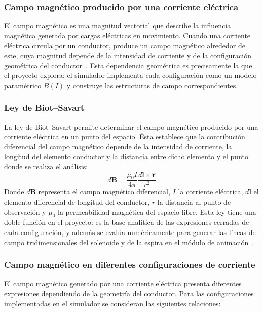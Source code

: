 \documentclass{article}
\begin{document}
\subsubsection{Campo magnético producido por una corriente eléctrica}

El campo magnético es una magnitud vectorial que describe la influencia magnética generada por cargas eléctricas en movimiento. Cuando una corriente eléctrica circula por un conductor, produce un campo magnético alrededor de este, cuya magnitud depende de la intensidad de corriente y de la configuración geométrica del conductor~\cite{young2009}. Esta dependencia geométrica es precisamente la que el proyecto explora: el simulador implementa cada configuración como un modelo paramétrico $B(I)$ y construye las estructuras de campo correspondientes.

\subsubsection{Ley de Biot--Savart}

La ley de Biot--Savart permite determinar el campo magnético producido por una corriente eléctrica en un punto del espacio. Ésta establece que la contribución diferencial del campo magnético depende de la intensidad de corriente, la longitud del elemento conductor y la distancia entre dicho elemento y el punto donde se realiza el análisis:
\begin{equation}
    d\boldsymbol{B} = \frac{\mu_0 I}{4\pi} \frac{d\boldsymbol{l} \times \hat{\boldsymbol{r}}}{r^2}
    \label{eq:biotsavart}
\end{equation}
Donde $d\boldsymbol{B}$ representa el campo magnético diferencial, $I$ la corriente eléctrica, $d\boldsymbol{l}$ el elemento diferencial de longitud del conductor, $r$ la distancia al punto de observación y $\mu_0$ la permeabilidad magnética del espacio libre. Esta ley tiene una doble función en el proyecto: es la base analítica de las expresiones cerradas de cada configuración, y además se evalúa numéricamente para generar las líneas de campo tridimensionales del solenoide y de la espira en el módulo de animación~\cite{giancoli2009}.

\subsubsection{Campo magnético en diferentes configuraciones de corriente}

El campo magnético generado por una corriente eléctrica presenta diferentes expresiones dependiendo de la geometría del conductor. Para las configuraciones implementadas en el simulador se consideran las siguientes relaciones:
\end{document}
